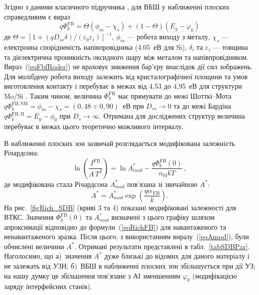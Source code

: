 Згідно з даними класичного підручника \cite{Rhoderick1988},
для ВБШ у наближенні плоских справедливим є вираз
\begin{equation}
\label{eqFbfRoder}
    q\Phi_{b}^\mathrm{FB}=\Theta(\phi_m-\chi_s)+(1-\Theta)(E_g-\varphi_0)
\end{equation}
де $\Theta=[1+(qD_{ss}\delta)/(\varepsilon_0\varepsilon_i)]^{-1}$,
$\phi_m$ --- робота виходу з металу,
$\chi_s$ --- електронна спорідненість напівпровідника (4.05~еВ для Si),
$\delta_i$ та $\varepsilon_i$ --- товщина та діелектрична проникність оксидного шару між металом та напівпровідником.
Вираз~(\ref{eqFbfRoder}) не враховує зниження бар'єру внаслідок дії сил зображень.
Для молібдену робота виходу залежить від кристалографічної площини та умов виготовлення контакту
і перебуває в межах від 4,53 до 4,95~еВ для структури Mo/Si \cite{MoWF2002}.
Таким чином, величина $\Phi_{b}^\mathrm{FB}$ має прямувати до межі Шотткі--Мота
$q\Phi_{b}^\mathrm{FB,SM}=\phi_m-\chi_s=(0,48\div0,90)$~еВ при $D_{ss}\rightarrow0$
та до межі Бардіна $q\Phi_{b}^\mathrm{FB,B}=E_g-\phi_0$ при $D_s\rightarrow\infty$.
Отримана для досліджених структур величина перебуває в межах цього теоретично можливого інтервалу.

В наближенні плоских зон зазвичай розглядається модифікована залежність Річардсона:
\begin{equation}
\label{eqRichFB}
\ln\left(\frac{I^\mathrm{FB}}{A\,T^2}\right)=\ln A^*_{mod}-\frac{q\Phi_{b}^\mathrm{FB}(0)}{n_\mathrm{id}kT}\,,
\end{equation}
де модифікована стала Річардсона $A^*_{mod}$  пов'язана зі звичайною $A^*$:
\begin{equation}
\label{eqAmod}
A^*=A^*_{mod}\exp\left(\frac{q\alpha_\mathrm{\,FB}}{k}\right).
\end{equation}
На рис.~\ref{figRich_SDB} (криві 3 та 4) показані модифіковані залежності для ВТКС.
Значення $\Phi_{b}^\mathrm{FB}(0)$ та $A^*_{mod}$ визначені з цього графіку шляхом апроксимації відповідно до формули~(\ref{eqRichFB})
для навантаженого та ненавантаженого зразка.
Після цього, з використанням виразу~(\ref{eqAmod}), були обчислені величини $A^*$.
Отримані результати представлені в табл.~\ref{tabSDBPar}.
Наголосимо, що
а)~значення $A^*$ дуже близькі до відомих для даного матеріалу і не залежать від УЗН;
б)~ВБШ в наближенні плоских зон збільшується при дії УЗ;
на нашу думку це збільшення пов'язане з АІ зменшенням $\varphi_0$ (модифікацією заряду інтерфейсних станів).

